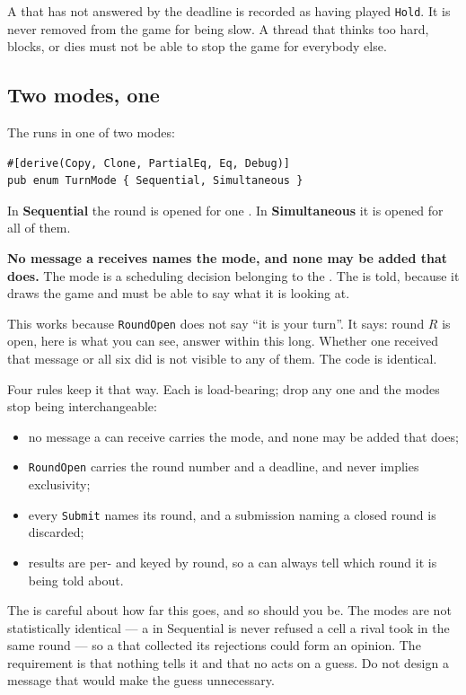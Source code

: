 \documentclass{article}
\begin{document}
A \ship{} that has not answered by the deadline is recorded as having played \texttt{Hold}. It is
never removed from the game for being slow. A thread that thinks too hard, blocks, or dies must not
be able to stop the game for everybody else.

\subsection{Two modes, one \ship}
\label{proto:modes}

The \admiralty{} runs in one of two modes:

\begin{lstlisting}
#[derive(Copy, Clone, PartialEq, Eq, Debug)]
pub enum TurnMode { Sequential, Simultaneous }
\end{lstlisting}

In \textbf{Sequential} the round is opened for one \ship. In \textbf{Simultaneous} it is opened
for all of them.

\textbf{No message a \ship{} receives names the mode, and none may be added that does.} The mode is
a scheduling decision belonging to the \admiralty. The
\cartographer{} is told, because it draws the game and must be able to say what it is looking at.

This works because \texttt{RoundOpen} does not say ``it is your turn''. It says: round $R$ is open,
here is what you can see, answer within this long. Whether one \ship{} received that message or
all six did is not visible to any of them. The \ship{} code is identical.

Four rules keep it that way. Each is load-bearing; drop any one and the modes stop being
interchangeable:

\begin{itemize}
    \item no message a \ship{} can receive carries the mode, and none may be added that does;
    \item \texttt{RoundOpen} carries the round number and a deadline, and never implies
      exclusivity;
    \item every \texttt{Submit} names its round, and a submission naming a closed round is
      discarded;
    \item results are per-\ship{} and keyed by round, so a \ship{} can always tell which round it is
      being told about.
\end{itemize}

The \MD{} is careful about how far this goes, and so should you be. The modes are not
statistically identical --- a \ship{} in Sequential is never refused a cell a rival took in the
same round --- so a \ship{} that collected its rejections could form an opinion. The requirement
is that nothing tells it and that no \ship{} acts on a guess. Do not design a message that would
make the guess unnecessary.
\end{document}

